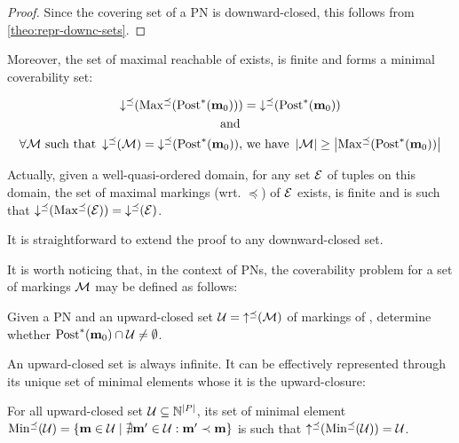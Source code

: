 \begin{proof}
  Since the covering set of a PN is downward-closed, this follows from \cref{theo:repr-downc-sets}.
\end{proof}

Moreover, the set of maximal reachable \omarks of \namePN exists, is finite and forms a minimal coverability set:


\begin{gather*}
\operatorname{\downarrow^\preceq}(\operatorname{Max^\preceq}(\operatorname{Post}^*_{{}}(\mathbf{m}_0))) = \operatorname{\downarrow^\preceq}(\operatorname{Post}^*_{{}}(\mathbf{m}_0)) \\*
\text{ and } \\*
\forall \mathcal{M} \text{ such that } \operatorname{\downarrow^\preceq}(\mathcal{M}) = \operatorname{\downarrow^\preceq}(\operatorname{Post}^*_{{}}(\mathbf{m}_0))\text{, we have } \left|\mathcal{M}\right| \geq \left|\operatorname{Max^\preceq}(\operatorname{Post}^*_{{}}(\mathbf{m}_0))\right|
\end{gather*}

Actually, given a well-quasi-ordered domain, for any set $\mathcal{E}$ of tuples on this domain, the set of maximal markings (wrt. $\preceq$) of $\mathcal{E}$ exists, is finite and is such that $\operatorname{\downarrow^\preceq}(\operatorname{Max^\preceq}(\mathcal{E})) = \operatorname{\downarrow^\preceq}(\mathcal{E})$.


It is straightforward to extend the proof to any downward-closed set.

It is worth noticing that, in the context of \acp{PN}, the coverability problem for a set of markings $\mathcal{M}$ may be defined as follows:
\begin{defi}
  \label{defi:upclocovprblm}
  Given a \ac{PN} \namePN and an upward-closed set $\mathcal{U} = \operatorname{\uparrow^\preceq}(\mathcal{M})$ of markings of \namePN, determine whether $\operatorname{Post}^*_{{}}(\mathbf{m}_0) \cap \mathcal{U} \neq \emptyset$.
\end{defi}

\label{text:upward-closed-set-representation}
An upward-closed set is always infinite.
It can be effectively represented through its unique set of minimal elements whose it is the upward-closure:
\begin{lemm}
  \label{theo:upward-closed-set-representation}
  For all upward-closed set $\mathcal{U} \subseteq \mathbb{N}^{\left|P\right|}$, its set of minimal element $\operatorname{Min^\preceq}(\mathcal{U}) = \{\mathbf{m} \in \mathcal{U} \mid \nexists \mathbf{m}' \in \mathcal{U} : \mathbf{m}' \prec \mathbf{m}\}$ is such that $\operatorname{\uparrow^\preceq}(\operatorname{Min^\preceq}(\mathcal{U})) = \mathcal{U}$.
\end{lemm}

